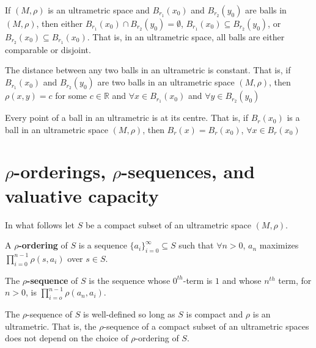 \begin{proposition*}
	If $(M, \rho)$ is an ultrametric space and $B_{r_1}(x_0)$ and $B_{r_2}(y_0)$ are balls in $(M, \rho)$, then either $B_{r_1}(x_0) \cap B_{r_2}(y_0) = \emptyset$, $B_{r_1}(x_0) \subseteq B_{r_2}(y_0)$, or $B_{r_2}(x_0) \subseteq B_{r_1}(x_0)$. That is, in an ultrametric space, all balls are either comparable or disjoint.
\end{proposition*}

\begin{proposition*}
\cite{ar} The distance between any two balls in an ultrametric is constant. That is, if $B_{r_1}(x_0)$ and $B_{r_2}(y_0)$ are two balls in an ultrametric space $(M,\rho)$, then $\rho(x,y)=c$ for some $c \in \mathbb{R}$ and $\forall x \in B_{r_1}(x_0)$ and $\forall y \in B_{r_2}(y_0)$
\end{proposition*}

\begin{proposition*}
\cite{ar} Every point of a ball in an ultrametric is at its centre. That is, if $B_r(x_0)$ is a ball in an ultrametric space $(M,\rho)$, then $B_r(x)=B_r(x_0)$,  $\forall x \in B_r(x_0)$
\end{proposition*}

\section{$\rho$-orderings, $\rho$-sequences, and valuative capacity}

In what follows let $S$ be a compact subset of an ultrametric space $(M,\rho)$.

\begin{definition*}
\cite{kj} A \textbf{$\rho$-ordering} of $S$ is a sequence $\{a_i\}_{i=0}^\infty \subseteq S$ such that $\forall n > 0$, $a_n$ maximizes $\prod_{i=0}^{n-1} \rho(s,a_i)$ over $s \in S$. 
\end{definition*}

\begin{definition*}
\cite{kj} The \textbf{$\rho$-sequence} of $S$ is the sequence whose $0^{th}$-term is $1$ and whose $n^{th}$ term, for $n >0$, is $\prod_{i=o}^{n-1} \rho(a_n,a_i)$.
\end{definition*}

\begin{proposition*}
\cite{kj} The $\rho$-sequence of $S$ is well-defined so long as $S$ is compact and $\rho$ is an ultrametric. That is, the $\rho$-sequence of a compact subset of an ultrametric spaces does not depend on the choice of $\rho$-ordering of $S$.
\end{proposition*}

